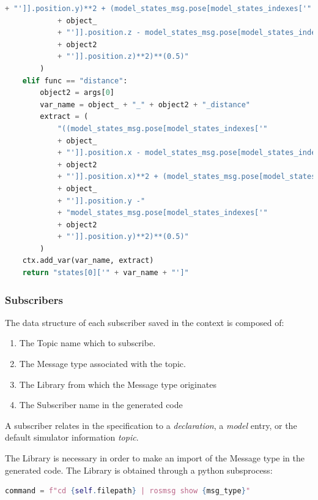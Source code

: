 \begin{lstlisting}[language=Python]
            + "']].position.y)**2 + (model_states_msg.pose[model_states_indexes['"
            + object_
            + "']].position.z - model_states_msg.pose[model_states_indexes['"
            + object2
            + "']].position.z)**2)**(0.5)"
        )
    elif func == "distance":
        object2 = args[0]
        var_name = object_ + "_" + object2 + "_distance"
        extract = (
            "((model_states_msg.pose[model_states_indexes['"
            + object_
            + "']].position.x - model_states_msg.pose[model_states_indexes['"
            + object2
            + "']].position.x)**2 + (model_states_msg.pose[model_states_indexes['"
            + object_
            + "']].position.y -"
            + "model_states_msg.pose[model_states_indexes['"
            + object2
            + "']].position.y)**2)**(0.5)"
        )
    ctx.add_var(var_name, extract)
    return "states[0]['" + var_name + "']"
\end{lstlisting}


\subsubsection{Subscribers}
\label{sssec:compileSubs}

The data structure of each subscriber saved in the context is composed of:

\begin{enumerate}
    \item The Topic name which to subscribe.
    \item The Message type associated with the topic.
    \item The Library from which the Message type originates
    \item The Subscriber name in the generated code
\end{enumerate}

A subscriber relates in the specification to a \textit{declaration}, a \textit{model} entry, or the default simulator information \textit{topic}.

The Library is necessary in order to make an import of the Message type in the generated code. The Library is obtained through a python subsprocess:

\begin{lstlisting}[language=Python]
    command = f"cd {self.filepath} | rosmsg show {msg_type}"
\end{lstlisting}

